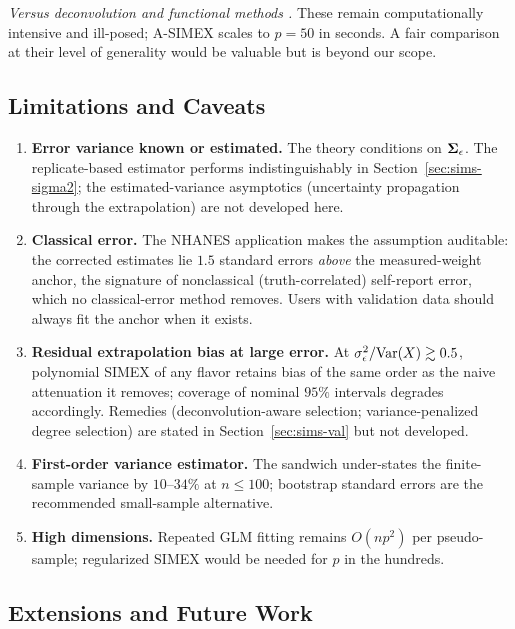 \emph{Versus deconvolution and functional methods
\citep{fan1993,delaigle2008}.} These remain computationally intensive
and ill-posed; A-SIMEX scales to $p=50$ in seconds. A fair comparison
at their level of generality would be valuable but is beyond our
scope.

\subsection{Limitations and Caveats}\label{sec:caveats}

\begin{enumerate}\itemsep3pt
\item \textbf{Error variance known or estimated.} The theory
      conditions on $\bm{\Sigma}_\epsilon$. The replicate-based estimator
      performs indistinguishably in Section~\ref{sec:sims-sigma2};
      the estimated-variance asymptotics (uncertainty propagation
      through the extrapolation) are not developed here.
\item \textbf{Classical error.} The NHANES application makes the
      assumption auditable: the corrected estimates lie $1.5$ standard
      errors \emph{above} the measured-weight anchor, the signature of
      nonclassical (truth-correlated) self-report error, which no
      classical-error method removes. Users with validation data
      should always fit the anchor when it exists.
\item \textbf{Residual extrapolation bias at large error.} At
      $\sigma^2_\epsilon/\mathrm{Var}(X)\gtrsim0.5$, polynomial SIMEX of any
      flavor retains bias of the same order as the naive attenuation
      it removes; coverage of nominal $95\%$ intervals degrades
      accordingly. Remedies (deconvolution-aware selection;
      variance-penalized degree selection) are stated in
      Section~\ref{sec:sims-val} but not developed.
\item \textbf{First-order variance estimator.} The sandwich
      under-states the finite-sample variance by $10$--$34\%$ at
      $n\le100$; bootstrap standard errors are the recommended
      small-sample alternative.
\item \textbf{High dimensions.} Repeated GLM fitting remains
      $O(np^2)$ per pseudo-sample; regularized SIMEX would be needed
      for $p$ in the hundreds.
\end{enumerate}

\subsection{Extensions and Future Work}\label{sec:extensions}

